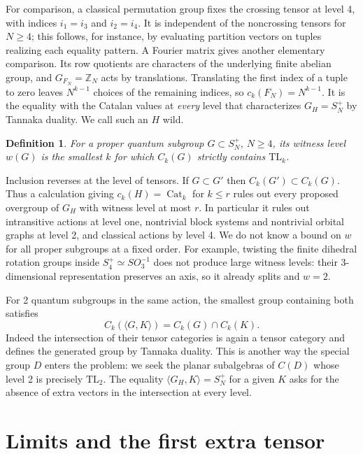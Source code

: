 \documentclass[11pt,a4paper]{amsart}
\newtheorem{definition}[theorem]{Definition}
\newcommand{\Cat}{\operatorname{Cat}}
\newcommand{\TL}{\mathrm{TL}}
\begin{document}
For comparison, a classical permutation group fixes the crossing tensor at level 4, with indices $i_1=i_3$ and $i_2=i_4$. It is independent of the noncrossing tensors for $N\geq4$; this follows, for instance, by evaluating partition vectors on tuples realizing each equality pattern. A Fourier matrix gives another elementary comparison. Its row quotients are characters of the underlying finite abelian group, and $G_{F_N}=\mathbb Z_N$ acts by translations. Translating the first index of a tuple to zero leaves $N^{k-1}$ choices of the remaining indices, so $c_k(F_N)=N^{k-1}$. It is the equality with the Catalan values at \emph{every} level that characterizes $G_H=S_N^+$ by Tannaka duality. We call such an $H$ wild.

\begin{definition}
For a proper quantum subgroup $G\subset S_N^+$, $N\geq4$, its witness level $w(G)$ is the smallest $k$ for which $C_k(G)$ strictly contains $\TL_k$.
\end{definition}

Inclusion reverses at the level of tensors. If $G\subset G'$ then $C_k(G')\subset C_k(G)$. Thus a calculation giving $c_k(H)=\Cat_k$ for $k\leq r$ rules out every proposed overgroup of $G_H$ with witness level at most $r$. In particular it rules out intransitive actions at level one, nontrivial block systems and nontrivial orbital graphs at level 2, and classical actions by level 4. We do not know a bound on $w$ for all proper subgroups at a fixed order. For example, twisting the finite dihedral rotation groups inside $S_4^+\simeq SO_3^{-1}$ does not produce large witness levels: their 3-dimensional representation preserves an axis, so it already splits and $w=2$.

For 2 quantum subgroups in the same action, the smallest group containing both satisfies
\[
 C_k(\langle G,K\rangle)=C_k(G)\cap C_k(K).
\]
Indeed the intersection of their tensor categories is again a tensor category and defines the generated group by Tannaka duality. This is another way the special group $D$ enters the problem: we seek the planar subalgebras of $C(D)$ whose level 2 is precisely $\TL_2$. The equality $\langle G_H,K\rangle=S_N^+$ for a given $K$ asks for the absence of extra vectors in the intersection at every level.

\section{Limits and the first extra tensor}\label{sec:limits}
\end{document}
